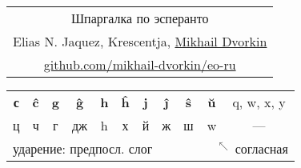 \documentclass{article}
\def\b#1{\textbf{#1}}
\begin{document}
~
\vspace{1em}

\hspace{2em}
\begin{tabular}{c}
{\Huge Шпаргалка по эсперанто} \\
{\small Elias N. Jaquez, Krescentja, \href{http://dvorkin.me/}{Mikhail Dvorkin}} \\
{\small \href{https://github.com/mikhail-dvorkin/eo-ru}{github.com/mikhail-dvorkin/eo-ru}} \\
\end{tabular}
\qquad
\begin{tabular}{|c|c|c|c|c|c|c|c|c|c|c|}
\hline
\b{с} & \b{ĉ} & \b{g} & \b{ĝ} & \b{h} & \b{ĥ} & \b{j} & \b{ĵ} & \b{ŝ} & \b{ŭ} & q, w, x, y \\
ц & ч & г & дж & h & х & й & ж & ш & w & --- \\
\hline
\multicolumn{9}{l}{ударение: предпосл. слог} & \multicolumn{2}{l}{{\tiny ~~$^\nwarrow$~}согласная} \\
\end{tabular}
\end{document}

